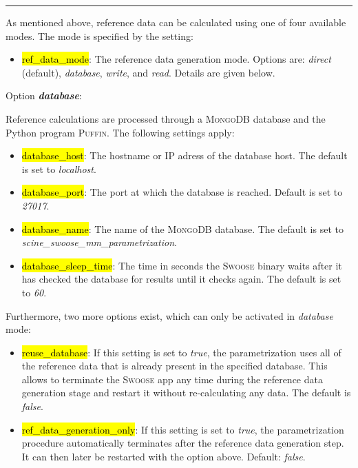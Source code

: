 \documentclass[]{tufte-book}
\begin{document}
\vspace{0.3cm}
\hrule
\vspace{0.3cm}

As mentioned above, reference data can be calculated using one of four available modes. The mode is specified by the setting:

\begin{itemize}
\item \hl{ref\_data\_mode}: The reference data generation mode. Options are: \textit{direct} (default), \textit{database}, \textit{write}, and \textit{read}. Details are given below.
\end{itemize}

Option \textit{\textbf{database}}:

Reference calculations are processed through a \textsc{MongoDB} database\cite{mongodb} and the Python program \textsc{Puffin}. The following settings apply:

\begin{itemize}
\item \hl{database\_host}: The hostname or IP adress of the database host. The default is set to \textit{localhost}.
\item \hl{database\_port}: The port at which the database is reached. Default is set to \textit{27017}.
\item \hl{database\_name}: The name of the \textsc{MongoDB} database. The default is set to \textit{scine\_swoose\_mm\_parametrization}.
\item \hl{database\_sleep\_time}: The time in seconds the \textsc{Swoose} binary waits after it has checked the database for results until it checks again. The default is set to \textit{60}.
\end{itemize}

Furthermore, two more options exist, which can only be activated in \textit{database} mode:

\begin{itemize}
\item \hl{reuse\_database}: If this setting is set to \textit{true}, the parametrization uses all of the reference data that is already present in the specified database. This allows to terminate the \textsc{Swoose} app any time during the reference data generation stage and restart it without re-calculating any data. The default is \textit{false}.
\item \hl{ref\_data\_generation\_only}: If this setting is set to \textit{true}, the parametrization procedure automatically terminates after the reference data generation step. It can then later be restarted with the option above. Default: \textit{false}.
\end{itemize}
\end{document}
